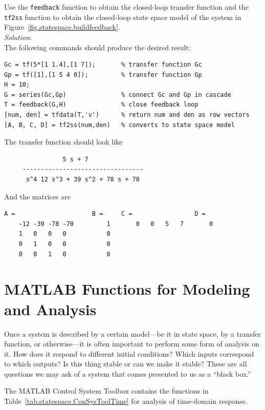 \begin{workex} \label{ex.buildfeedback}
Use the \verb=feedback= function to obtain the closed-loop transfer function and the \verb=tf2ss= function to obtain the closed-loop state space model of the system in Figure~\ref{fig.statespace.buildfeedback}.\\
\textit{Solution}:\\
The following commands should produce the desired result:
\begin{verbatim}
Gc = tf(5*[1 1.4],[1 7]);       % transfer function Gc
Gp = tf([1],[1 5 4 0]);         % transfer function Gp
H = 10;
G = series(Gc,Gp)               % connect Gc and Gp in cascade
T = feedback(G,H)               % close feedback loop
[num, den] = tfdata(T,'v')      % return num and den as row vectors
[A, B, C, D] = tf2ss(num,den)   % converts to state space model
\end{verbatim}

The transfer function should look like
\begin{verbatim}
                5 s + 7
     ---------------------------------
      s^4 12 s^3 + 39 s^2 + 78 s + 70
\end{verbatim}

And the matrices are
\begin{verbatim}
A =                     B =     C =                 D =
    -12 -39 -78 -70         1       0   0   5   7       0
    1   0   0   0           0
    0   1   0   0           0
    0   0   1   0           0
\end{verbatim}
\end{workex}

\section{MATLAB Functions for Modeling and Analysis}
Once a system is described by a certain model---be it in state space, by a transfer function, or otherwise---it is often important to perform some form of analysis on it.  How does it respond to different initial conditions?  Which inputs correspond to which outputs?  Is this thing stable or can we make it stable?  These are all questions we may ask of a system that comes presented to us as a ``black box.''
\par
The MATLAB Control System Toolbox contains the functions in Table~\ref{tab.statespace.ConSysToolTime} for analysis of time-domain response.


